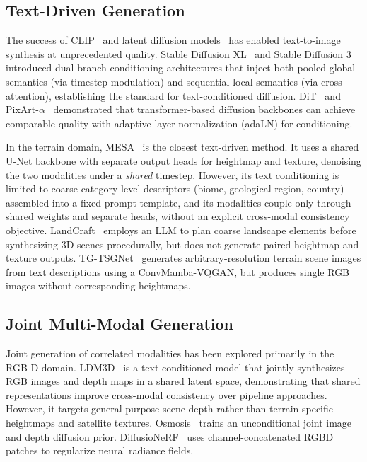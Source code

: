 \documentclass[review]{vgtc}                 %
\begin{document}
\subsection{Text-Driven Generation}

The success of CLIP~\cite{CLIP:2021} and latent diffusion models~\cite{LDM:2022} has enabled text-to-image synthesis at unprecedented quality.
Stable Diffusion XL~\cite{SDXL:2024} and Stable Diffusion 3~\cite{SD3:2024} introduced dual-branch conditioning architectures that inject both pooled global semantics (via timestep modulation) and sequential local semantics (via cross-attention), establishing the standard for text-conditioned diffusion.
DiT~\cite{DiT:2023} and PixArt-$\alpha$~\cite{PixArt:2024} demonstrated that transformer-based diffusion backbones can achieve comparable quality with adaptive layer normalization (adaLN) for conditioning.

In the terrain domain, MESA~\cite{MESA:2025} is the closest text-driven method.
It uses a shared U-Net backbone with separate output heads for heightmap and texture, denoising the two modalities under a \emph{shared} timestep.
However, its text conditioning is limited to coarse category-level descriptors (biome, geological region, country) assembled into a fixed prompt template, and its modalities couple only through shared weights and separate heads, without an explicit cross-modal consistency objective.
LandCraft~\cite{LandCraft:2026} employs an LLM to plan coarse landscape elements before synthesizing 3D scenes procedurally, but does not generate paired heightmap and texture outputs.
TG-TSGNet~\cite{11306245} generates arbitrary-resolution terrain scene images from text descriptions using a ConvMamba-VQGAN, but produces single RGB images without corresponding heightmaps.

\subsection{Joint Multi-Modal Generation}

Joint generation of correlated modalities has been explored primarily in the RGB-D domain.
LDM3D~\cite{LDM3D:2023} is a text-conditioned model that jointly synthesizes RGB images and depth maps in a shared latent space, demonstrating that shared representations improve cross-modal consistency over pipeline approaches.
However, it targets general-purpose scene depth rather than terrain-specific heightmaps and satellite textures.
Osmosis~\cite{Osmosis:2025} trains an unconditional joint image and depth diffusion prior.
DiffusioNeRF~\cite{DiffusioNeRF:2023} uses channel-concatenated RGBD patches to regularize neural radiance fields.
\end{document}
